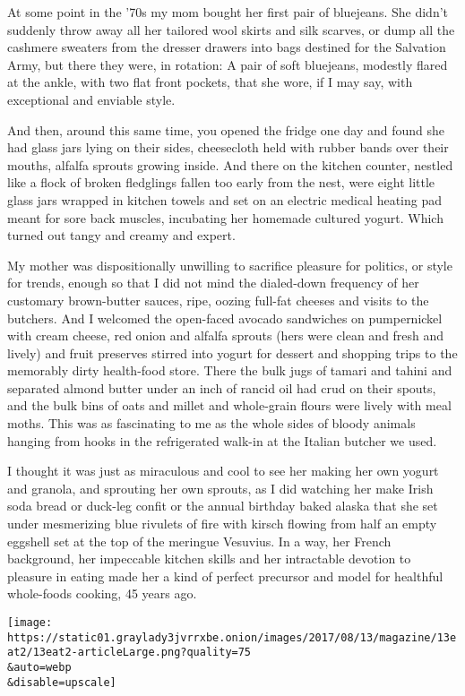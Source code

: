 At some point in the '70s my mom bought her first pair of bluejeans. She
didn't suddenly throw away all her tailored wool skirts and silk
scarves, or dump all the cashmere sweaters from the dresser drawers into
bags destined for the Salvation Army, but there they were, in rotation:
A pair of soft bluejeans, modestly flared at the ankle, with two flat
front pockets, that she wore, if I may say, with exceptional and
enviable style.

And then, around this same time, you opened the fridge one day and found
she had glass jars lying on their sides, cheesecloth held with rubber
bands over their mouths, alfalfa sprouts growing inside. And there on
the kitchen ­counter, nestled like a flock of broken fledglings fallen
too early from the nest, were eight little glass jars wrapped in kitchen
towels and set on an electric medical heating pad meant for sore back
muscles, incubating her homemade cultured yogurt. Which turned out tangy
and creamy and expert.

My mother was dispositionally unwilling to sacrifice pleasure for
politics, or style for trends, enough so that I did not mind the
dialed-down frequency of her customary brown-butter sauces, ripe, oozing
full-fat cheeses and visits to the butchers. And I welcomed the
open-faced avocado sandwiches on pumpernickel with cream cheese, red
onion and alfalfa sprouts (hers were clean and fresh and lively) and
fruit preserves stirred into yogurt for dessert and shopping trips to
the memorably dirty health-food store. There the bulk jugs of tamari and
tahini and separated almond butter under an inch of rancid oil had crud
on their spouts, and the bulk bins of oats and millet and whole-grain
flours were lively with meal moths. This was as fascinating to me as the
whole sides of bloody animals hanging from hooks in the refrigerated
walk-in at the Italian butcher we used.

I thought it was just as miraculous and cool to see her making her own
yogurt and granola, and sprouting her own sprouts, as I did watching her
make Irish soda bread or duck-leg confit or the annual birthday baked
alaska that she set under mesmerizing blue rivulets of fire with kirsch
flowing from half an empty eggshell set at the top of the meringue
Vesuvius. In a way, her French background, her impeccable kitchen skills
and her intractable devotion to pleasure in eating made her a kind of
perfect precursor and model for healthful whole-foods cooking, 45 years
ago.

\texttt{[image: https://static01.graylady3jvrrxbe.onion/images/2017/08/13/magazine/13eat2/13eat2-articleLarge.png?quality=75\\\&auto=webp\\\&disable=upscale]}

